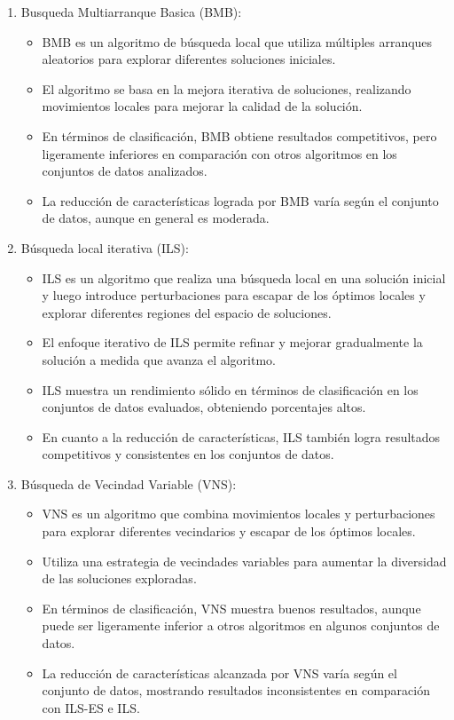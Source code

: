 \begin{enumerate}
\item Busqueda Multiarranque Basica (BMB):

\begin{itemize}
	\item BMB es un algoritmo de búsqueda local que utiliza múltiples arranques aleatorios para explorar diferentes soluciones iniciales.
\item  El algoritmo se basa en la mejora iterativa de soluciones, realizando movimientos locales para mejorar la calidad de la solución.
\item En términos de clasificación, BMB obtiene resultados competitivos, pero ligeramente inferiores en comparación con otros algoritmos en los conjuntos de datos analizados.
\item La reducción de características lograda por BMB varía según el conjunto de datos, aunque en general es moderada.
\end{itemize}

\item Búsqueda local iterativa (ILS):
\begin{itemize}
\item  ILS es un algoritmo que realiza una búsqueda local en una solución inicial y luego introduce perturbaciones para escapar de los óptimos locales y explorar diferentes regiones del espacio de soluciones.
\item  El enfoque iterativo de ILS permite refinar y mejorar gradualmente la solución a medida que avanza el algoritmo.
\item  ILS muestra un rendimiento sólido en términos de clasificación en los conjuntos de datos evaluados, obteniendo porcentajes altos.
\item En cuanto a la reducción de características, ILS también logra resultados competitivos y consistentes en los conjuntos de datos.
\end{itemize}


\item Búsqueda de Vecindad Variable (VNS):
\begin{itemize}
\item VNS es un algoritmo que combina movimientos locales y perturbaciones para explorar diferentes vecindarios y escapar de los óptimos locales.
\item Utiliza una estrategia de vecindades variables para aumentar la diversidad de las soluciones exploradas.
\item En términos de clasificación, VNS muestra buenos resultados, aunque puede ser ligeramente inferior a otros algoritmos en algunos conjuntos de datos.
\item La reducción de características alcanzada por VNS varía según el conjunto de datos, mostrando resultados inconsistentes en comparación con ILS-ES e ILS.
\end{itemize}



\end{enumerate}
